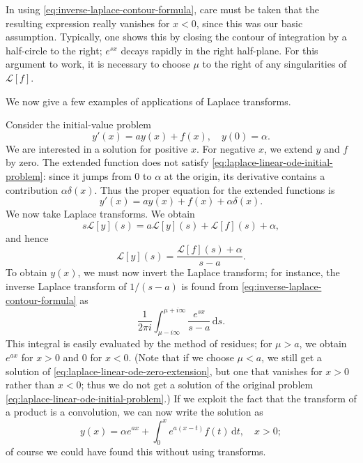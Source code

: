 In using \eqref{eq:inverse-laplace-contour-formula}, care must be taken that the resulting expression really vanishes for $x<0$, since this was our basic assumption. Typically, one shows this by closing the contour of integration by a half-circle to the right; $e^{sx}$ decays rapidly in the right half-plane. For this argument to work, it is necessary to choose $\mu$ to the right of any singularities of $\mathcal{L}[f]$.

We now give a few examples of applications of Laplace transforms.

\begin{Example}
\label{ex:laplace-linear-ode}
Consider the initial-value problem
\begin{equation}\label{eq:laplace-linear-ode-initial-problem}
y'(x)=ay(x)+f(x),\quad y(0)=\alpha.
\end{equation}
We are interested in a solution for positive $x$. For negative $x$, we extend $y$ and $f$ by zero. The extended function does not satisfy \eqref{eq:laplace-linear-ode-initial-problem}: since it jumps from 0 to $\alpha$ at the origin, its derivative contains a contribution $\alpha\delta(x)$. Thus the proper equation for the extended functions is
\begin{equation}\label{eq:laplace-linear-ode-zero-extension}
y'(x)=ay(x)+f(x)+\alpha\delta(x).
\end{equation}
We now take Laplace transforms. We obtain
\begin{equation}\label{eq:laplace-linear-ode-transformed-equation}
s\mathcal{L}[y](s)=a\mathcal{L}[y](s)+\mathcal{L}[f](s)+\alpha,
\end{equation}
and hence
\begin{equation}\label{eq:laplace-linear-ode-transform-solution}
\mathcal{L}[y](s)=\dfrac{\mathcal{L}[f](s)+\alpha}{s-a}.
\end{equation}
To obtain $y(x)$, we must now invert the Laplace transform; for instance, the inverse Laplace transform of $1/(s-a)$ is found from \eqref{eq:inverse-laplace-contour-formula} as
\begin{equation}\label{eq:laplace-exponential-residue-integral}
\dfrac1{2\pi i}\int_{\mu-i\infty}^{\mu+i\infty}\dfrac{e^{sx}}{s-a}\,\mathrm{d}s.
\end{equation}
This integral is easily evaluated by the method of residues; for $\mu>a$, we obtain $e^{ax}$ for $x>0$ and 0 for $x<0$. (Note that if we choose $\mu<a$, we still get a solution of \eqref{eq:laplace-linear-ode-zero-extension}, but one that vanishes for $x>0$ rather than $x<0$; thus we do not get a solution of the original problem \eqref{eq:laplace-linear-ode-initial-problem}.) If we exploit the fact that the transform of a product is a convolution, we can now write the solution as
\begin{equation}\label{eq:laplace-linear-ode-causal-solution}
y(x)=\alpha e^{ax}+\int_0^xe^{a(x-t)}f(t)\,\mathrm{d}t,\quad x>0;
\end{equation}
of course we could have found this without using transforms.
\end{Example}
